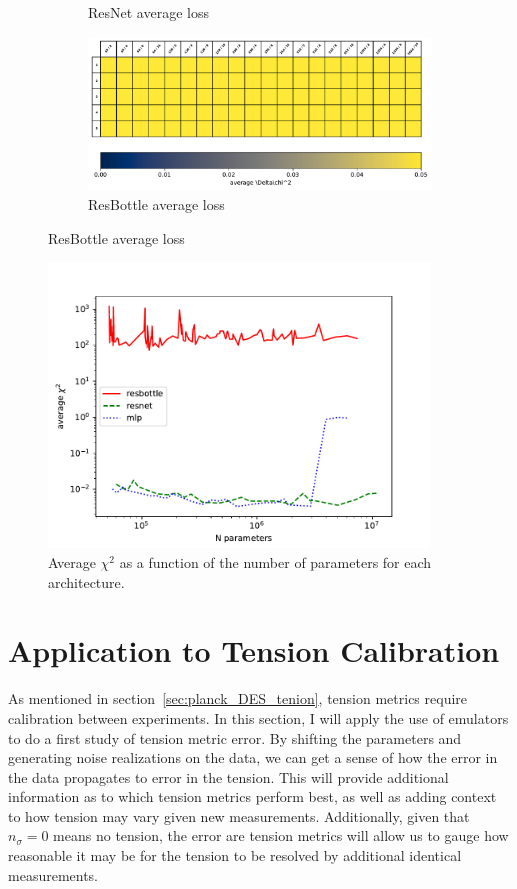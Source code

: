 \begin{figure}[tb]
\begin{subfigure}[b]{0.49\textwidth}
		\caption{ResNet average loss}
		\label{fig:resnet_table}
	\end{subfigure}
	\begin{subfigure}[b]{0.9\textwidth}
		\includegraphics[width=\textwidth]{plots/model_table_resbottle.pdf}
		\caption{ResBottle average loss}
		\label{fig:resbottle_table}
	\end{subfigure}
	\label{fig:model_tables}
\end{figure}

\begin{figure}[tb]
	\centering
	\includegraphics[width=0.9\textwidth]{plots/avg_chi2_v_n_params_new.pdf}
	\caption{Average $\chi^2$ as a function of the number of parameters for each architecture.}
	\label{fig:avg_chi2_nparams}
\end{figure}
\section{Application to Tension Calibration}
As mentioned in section~\ref{sec:planck_DES_tenion}, tension metrics require calibration between experiments. In this section, I will apply the use of emulators to do a first study of tension metric error. By shifting the parameters and generating noise realizations on the data, we can get a sense of how the error in the data propagates to error in the tension. This will provide additional information as to which tension metrics perform best, as well as adding context to how tension may vary given new measurements. Additionally, given that $n_\sigma=0$ means no tension, the error are tension metrics will allow us to gauge how reasonable it may be for the tension to be resolved by additional identical measurements.

